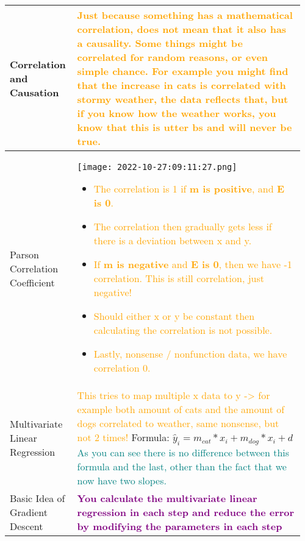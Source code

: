 \documentclass[main.tex,fontsize=8pt,paper=a4,paper=portrait,DIV=calc,]{scrartcl}
\begin{document}
\begin{table}[ht!]
\begin{tabular}{|m{0.2\linewidth}|m{0.755\linewidth}|}
\hline
Correlation and Causation &
\textcolor{orange}{Just because something has a mathematical correlation, does not mean that it also has a causality. Some things might be correlated for random reasons, or even simple chance. \newline
For example you might find that the increase in cats is correlated with stormy weather, the data reflects that, but if you know how the weather works, you know that this is utter bs and will never be true.}\\
\hline
Parson Correlation Coefficient & 
\vspace{2mm}
\texttt{[image: 2022-10-27:09:11:27.png]}\newline
\begin{itemize}
\item \textcolor{orange}{The correlation is 1 if \textbf{m is positive}, and \textbf{E is 0}.}
\item \textcolor{orange}{The correlation then gradually gets less if there is a deviation between x and y.}
\item \textcolor{orange}{If \textbf{m is negative} and \textbf{E is 0}, then we have -1 correlation. This is still correlation, just negative!}
\item \textcolor{orange}{Should either x or y be constant then calculating the correlation is not possible.}
\item \textcolor{orange}{Lastly, nonsense / nonfunction data, we have correlation 0.}
\vspace{-3mm}
\end{itemize}\\
\hline
Multivariate Linear Regression & 
\textcolor{orange}{This tries to map multiple x data to y -> for example both amount of cats and the amount of dogs correlated to weather, same nonsense, but not 2 times!}\newline
Formula: \( \hat{y}_i = m_{cat} * x_i + m_{dog} * x_i + d \)\newline
\textcolor{teal}{As you can see there is no difference between this formula and the last, other than the fact that we now have two slopes.}\\
\hline
Basic Idea of Gradient Descent & 
\textbf{\textcolor{purple}{You calculate the multivariate linear regression in each step and reduce the error by modifying the parameters in each step}}\newline

\end{tabular}
\end{table}
\end{document}

